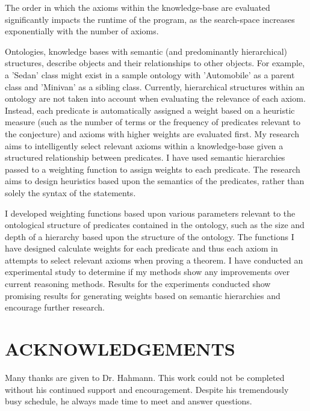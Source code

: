 \documentclass{article}
\begin{document}
The order in which the axioms within the knowledge-base are evaluated significantly impacts the runtime of the program, as the search-space increases exponentially with the number of axioms. 

Ontologies, knowledge bases with semantic (and predominantly hierarchical) structures, describe objects and their relationships to other objects. For example, a 'Sedan' class might exist in a sample ontology with 'Automobile' as a parent class and 'Minivan' as a sibling class. Currently, hierarchical structures within an ontology are not taken into account when evaluating the relevance of each axiom. Instead, each predicate is automatically assigned a weight based on a heuristic measure (such as the number of terms or the frequency of predicates relevant to the conjecture) and axioms with higher weights are evaluated first. My research aims to intelligently select relevant axioms within a knowledge-base given a structured relationship between predicates. I have used semantic hierarchies passed to a weighting function to assign weights to each predicate. The research aims to design heuristics based upon the semantics of the predicates, rather than solely the syntax of the statements. 

I developed weighting functions based upon various parameters relevant to the ontological structure of predicates contained in the ontology, such as the size and depth of a hierarchy based upon the structure of the ontology. The functions I have designed calculate weights for each predicate and thus each axiom in attempts to select relevant axioms when proving a theorem. I have conducted an experimental study to determine if my methods show any improvements over current reasoning methods. Results for the experiments conducted show promising results for generating weights based on semantic hierarchies and encourage further research. 
	
\setcounter{page}{3}
\newpage
{}
\vspace*{.05in}
\section*{\MakeUppercase{Acknowledgements}}
        
Many thanks are given to Dr. Hahmann. This work could not be completed without his continued support and encouragement. Despite his tremendously busy schedule, he always made time to meet and answer questions. 
\end{document}
